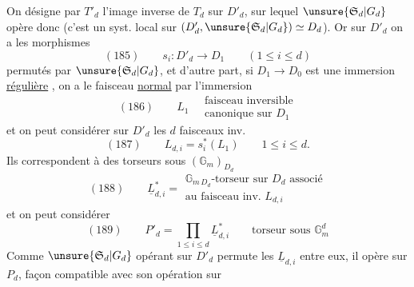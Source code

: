 On désigne par $T'_d$ l'image inverse de $T_d$ sur $D'_d$, sur lequel $\unsure{\mathfrak S_d|G_d}$ opère donc (c'est un  syst. local sur $(D'_d,\unsure{\mathfrak S_d|G_d})\simeq D_d$). Or sur $D'_d$ on a les  morphismes
\[
(185)\qquad s_i:D'_d\longrightarrow D_1\qquad(1\leq i\leq d)
\]
permutés par $\unsure{\mathfrak S_d|G_d}$, et d'autre part, si $D_1\longrightarrow D_0$ est une immersion \uline{régulière} , on a  le faisceau \uline{normal} par l'immersion
\[
(186)\qquad L_1\quad\begin{gathered}\text{faisceau inversible}\\\text{canonique sur }D_1\end{gathered}
\]
et on peut considérer sur $D'_d$ les $d$ faisceaux inv.
\[
(187)\qquad L_{d,i}=s_i^*(L_1)\qquad1\leq i\leq d.
\]
Ils correspondent à des torseurs sous $(\mathbb G_m)_{D_d}$
\[
(188)\qquad\underline L_{d,i}^*=\begin{gathered}\mathbb G_{m\,D_d}\text{-torseur sur }D_d\text{ associé}\\\text{au faisceau inv. }L_{d,i}
\end{gathered}
\]
et on peut considérer
\[
(189)\qquad P'_d=\prod_{1\leq i\leq d}\underline L_{d,i}^*\qquad\text{torseur sous }\mathbb G_m^d
\]
Comme $\unsure{\mathfrak S_d|G_d}$ opérant sur $D'_d$ permute les  $\underline L_{d,i}$ entre eux, il opère sur $P_d$,    façon compatible avec son opération sur
